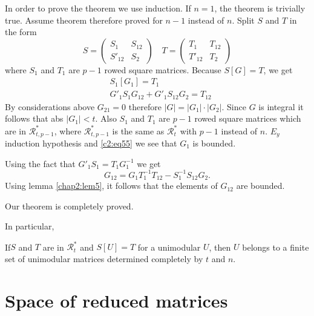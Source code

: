 In order to prove the theorem we use induction. If $n=1$, the theorem
is trivially true. Assume theorem therefore proved for $n-1$ instead
of $n$. Split $S$ and $T$ in the form 
$$
S=
\begin{pmatrix}
S_{1} & S_{12}\\
S'_{12} & S_{2}
\end{pmatrix}
\quad T=
\begin{pmatrix}
T_{1} & T_{12}\\
T'_{12} & T_{2}
\end{pmatrix}
$$
where $S_{1}$ and $T_{1}$ are $p-1$ rowed square matrices. Because
$S[G]=T$, we get
\begin{equation*}
\begin{split}
& S_{1}[G_{1}]=T_{1}\\
& G'_{1}S_{1}G_{12}+G'_{1}S_{12}G_{2}=T_{12}
\end{split}\tag{55}\label{c2:eq55}
\end{equation*}
By considerations above $G_{21}=0$ therefore $|G|=|G_{1}|\cdot
|G_{2}|$. Since $G$ is integral it follows that abs $|G_{1}|<t$. Also
$S_{1}$ and $T_{1}$ are $p-1$ rowed square matrices which are in
$\mathscr{R}^{\ast}_{t,p-1}$, where $\mathscr{R}^{\ast}_{t,p-1}$ is
the same as $\mathscr{R}^{\ast}_{t}$ with $p-1$ instead of
$n$. $E_{y}$ induction hypothesis and \eqref{c2:eq55} we see that $G_{1}$
is bounded.

Using the fact that $G'_{1}S_{1}=T_{1}G^{-1}_{1}$ we get
$$
G_{12}=G_{1}T^{-1}_{1}T_{12}-S^{-1}_{1}S_{12}G_{2}.
$$
Using lemma \ref{chap2:lem5}, it follows that the elements of $G_{12}$ are
bounded.

Our theorem is completely proved.

In particular,

\begin{coro*}
If\pageoriginale $S$ and $T$ are in $\mathscr{R}^{\ast}_{t}$ and
$S[U]=T$ for a unimodular $U$, then $U$ belongs to a finite set of
unimodular matrices determined completely by $t$ and $n$.
\end{coro*}

\section{Space of reduced matrices}\label{chap2:sec5}

